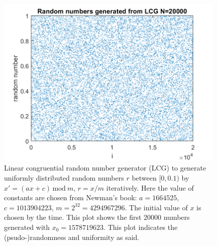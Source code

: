\documentclass[12pt, graphicx]{article}
\begin{document}
\begin{figure}[ht]
\centering
\includegraphics[width = 110mm]{lcg.png}
\caption{Linear congruential random number generator (LCG) to generate uniformly distributed random numbers $r$ between $[0, 0.1)$ by $x'=(ax+c)\,\mbox{mod}\: m$, $r=x/m$ iteratively. Here the value of constants are chosen from Newman's book: $a=1664525$, $c=1013904223$, $m=2^{32}=4294967296$. The initial value of $x$ is chosen by the time. This plot shows the first 20000 numbers generated with $x_0=1578719623$. This plot indicates the (psudo-)randomness and uniformity as said.}
\label{fig:lcg}
\end{figure}
\end{document}
